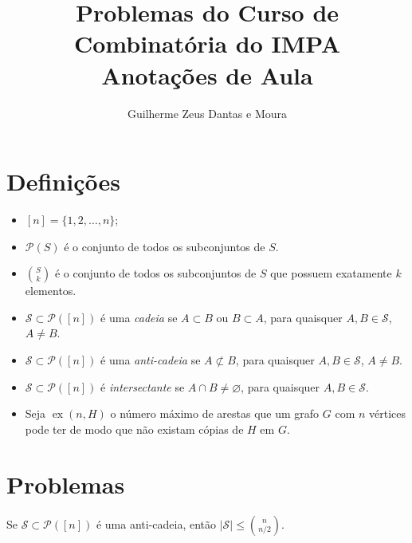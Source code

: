 \documentclass[10pt,a4paper]{article}
\title{Problemas do Curso de Combinatória do IMPA \\[1mm] Anotações de Aula}
\author{Guilherme Zeus Dantas e Moura}
\DeclareMathOperator\ex{ex}
\begin{document}
	
	\zeustitle

	\section*{\textsf{Definições}}

	\begin{itemize}
		\item $[n] = \{1, 2, \dots, n\}$;
		\item $\mathcal{P}(S)$ é o conjunto de todos os subconjuntos de $S$.
		\item $\binom{S}{k}$ é o conjunto de todos os subconjuntos de $S$ que possuem exatamente $k$ elementos.
		\item $\mathcal{S} \subset \mathcal{P}([n])$ é uma \emph{cadeia} se $A \subset B$ ou $B \subset A$, para quaisquer $A, B \in \mathcal{S}$, $A \neq B$.
		\item $\mathcal{S} \subset \mathcal{P}([n])$ é uma \emph{anti-cadeia} se $A \not\subset B$, para quaisquer $A, B \in \mathcal{S}$, $A \neq B$.
		\item $\mathcal{S} \subset \mathcal{P}([n])$ é \emph{intersectante} se $A \cap B \neq \varnothing$, para quaisquer  $A, B \in \mathcal{S}$.
		\item Seja $\ex(n, H)$ o número máximo de arestas que um grafo $G$ com $n$ vértices pode ter de modo que não existam cópias de $H$ em $G$.
	\end{itemize}

	\section*{\textsf{Problemas}}


\begin{prob}[Sperner, 1910's] \label{thm:sperner}
	Se $\mathcal{S} \subset \mathcal P([n])$ é uma anti-cadeia, então $|\mathcal{S}| \le \binom{n}{n/2}$.
\end{prob}
\end{document}
